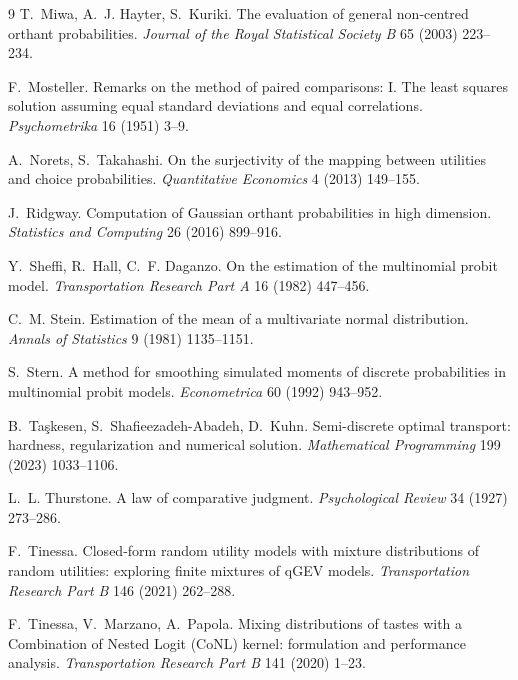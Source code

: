 \documentclass[12pt]{article}
\theoremstyle{remark}
\begin{document}
\begin{thebibliography}{9}
 T.~Miwa,
A.~J. Hayter, S.~Kuriki. The evaluation of general non-centred orthant
probabilities. \emph{Journal of the Royal Statistical Society B} 65
(2003) 223--234.

 F.~Mosteller. Remarks on the
method of paired comparisons: I. The least squares solution assuming
equal standard deviations and equal correlations. \emph{Psychometrika}
16 (1951) 3--9.

 A.~Norets, S.~Takahashi. On the surjectivity of the
mapping between utilities and choice probabilities. \emph{Quantitative
Economics} 4 (2013) 149--155.

 J.~Ridgway. Computation of Gaussian orthant
probabilities in high dimension. \emph{Statistics and Computing} 26 (2016)
899--916.

Y.~Sheffi, R.~Hall, C.~F. Daganzo. On the estimation of the multinomial
probit model. \emph{Transportation Research Part A} 16 (1982) 447--456.

 C.~M. Stein. Estimation of the mean
of a multivariate normal distribution. \emph{Annals of Statistics} 9
(1981) 1135--1151.

 S.~Stern. A method for smoothing
simulated moments of discrete probabilities in multinomial probit
models. \emph{Econometrica} 60 (1992) 943--952.

 B.~Ta\c{s}kesen, S.~Shafieezadeh-Abadeh,
D.~Kuhn. Semi-discrete optimal transport: hardness, regularization and
numerical solution. \emph{Mathematical Programming} 199 (2023)
1033--1106.

 L.~L. Thurstone. A law of comparative judgment.
\emph{Psychological Review} 34 (1927) 273--286.

 F.~Tinessa. Closed-form random
utility models with mixture distributions of random utilities:
exploring finite mixtures of qGEV models. \emph{Transportation
Research Part B} 146 (2021) 262--288.

F.~Tinessa, V.~Marzano, A.~Papola. Mixing distributions of tastes with
a Combination of Nested Logit (CoNL) kernel: formulation and
performance analysis. \emph{Transportation Research Part B} 141 (2020)
1--23.


\end{thebibliography}
\end{document}
